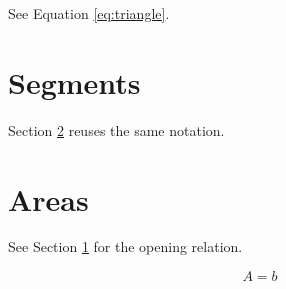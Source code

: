 \documentclass{article}
\begin{document}
\noindent See Equation \ref{eq:triangle}.

\section{Segments}
\label{sec:segments}
Section \ref{sec:areas} reuses the same notation.

\section{Areas}
\label{sec:areas}
See Section \ref{sec:segments} for the opening relation.

\begin{equation}
\label{eq:triangle}
A = b
\end{equation}
\end{document}
